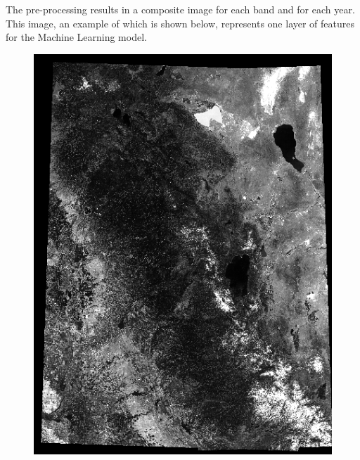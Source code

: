 The pre-processing results in a composite image for each band and for each year. This image, an example of which is shown below, represents one layer of features for the Machine Learning model.

\begin{figure}
\includegraphics[width=\textwidth]{images/band.png}
\end{figure}

